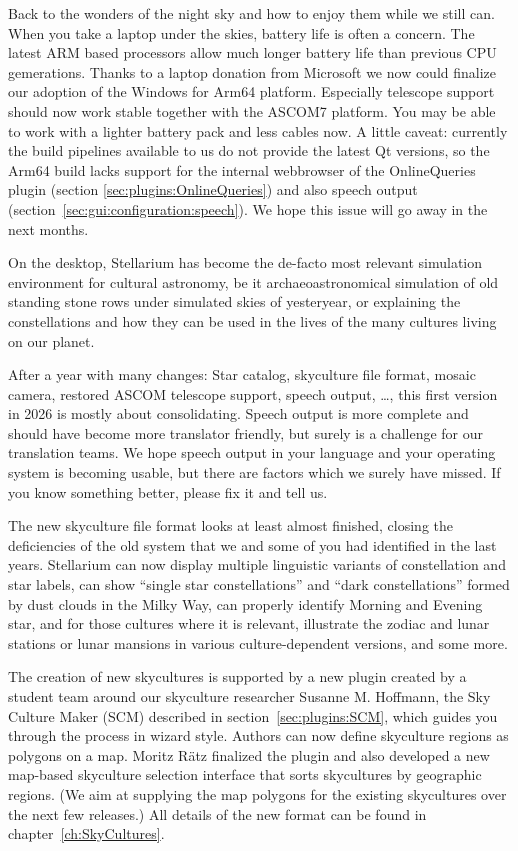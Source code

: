 Back to the wonders of the night sky and how to enjoy them while we still can.
When you take a laptop under the skies, battery life is often a concern. The latest ARM based processors allow much longer battery life than previous CPU gemerations.  
Thanks to a laptop donation from Microsoft we now could finalize our adoption of the Windows for Arm64 platform. Especially telescope support should now work stable together with the ASCOM7 platform. 
You may be able to work with a lighter battery pack and less cables now. A little caveat: currently the build pipelines available to us do not provide the latest Qt versions, so the Arm64 build lacks support for 
the internal webbrowser of the OnlineQueries plugin (section \ref{sec:plugins:OnlineQueries}) and also speech output (section~\ref{sec:gui:configuration:speech}). We hope this issue will go away in the next months.

On the desktop, Stellarium has become the de-facto most relevant simulation environment for cultural astronomy, 
be it archaeoastronomical simulation of old standing stone rows under simulated skies of yesteryear, 
or explaining the constellations and how they can be used in the lives of the many cultures living on our planet. 


After a year with many changes: Star catalog, skyculture file format, mosaic camera, restored ASCOM telescope support, speech output, \ldots,
this first version in 2026 is mostly about consolidating. Speech output is more complete and should have become more translator friendly, but surely is a challenge for our translation teams. 
We hope speech output in your language and your operating system is becoming usable, but there are factors which we surely have missed. If you know something better, please fix it and tell us.


The new skyculture file format looks at least almost finished, closing the deficiencies of the old system that we and some of you had identified in the last years. 
Stellarium can now display multiple linguistic variants of constellation and star labels, can show ``single star constellations'' and ``dark constellations'' 
formed by dust clouds in the Milky Way, can properly identify Morning and Evening star, and for those cultures where it is relevant, 
illustrate the zodiac and lunar stations or lunar mansions in various culture-dependent versions, and some more. 

The creation of new skycultures is supported by a new plugin created by a student team around our skyculture researcher Susanne M. Hoffmann, 
the Sky Culture Maker (SCM) described in section~\ref{sec:plugins:SCM}, which guides you through the process in wizard style. 
Authors can now define skyculture regions as polygons on a map. 
Moritz Rätz finalized the plugin and also developed a new map-based skyculture selection interface that sorts skycultures by geographic regions.
(We aim at supplying the map polygons for the existing skycultures over the next few releases.) 
All details of the new format can be found in chapter~\ref{ch:SkyCultures}. 

